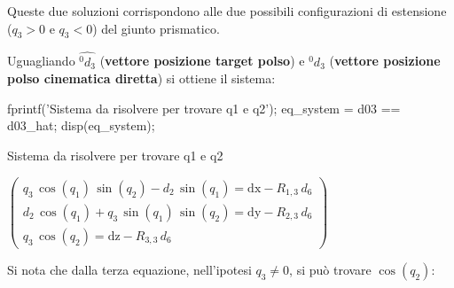 \documentclass[11pt, a4paper]{article}
\begin{document}
\begin{par}
\begin{flushleft}
Queste due soluzioni corrispondono alle due possibili configurazioni di estensione ($q_3 >0$ e $q_3 <0$) del giunto prismatico.
\end{flushleft}
\end{par}

\begin{par}
\begin{flushleft}
Uguagliando $\hat{^0 d_3 }$ (\textbf{vettore posizione target polso}) e $^0 d_3$ (\textbf{vettore posizione polso cinematica diretta}) si ottiene il sistema:
\end{flushleft}
\end{par}

\begin{matlabcode}
fprintf('Sistema da risolvere per trovare q1 e q2');
eq_system = d03 == d03_hat;
disp(eq_system);
\end{matlabcode}
\begin{matlaboutput}
Sistema da risolvere per trovare q1 e q2
\end{matlaboutput}
\begin{matlabsymbolicoutput}
$\displaystyle \left(\begin{array}{c}
q_3 \,\cos \left(q_1 \right)\,\sin \left(q_2 \right)-d_2 \,\sin \left(q_1 \right)=\textrm{dx}-R_{1,3} \,d_6 \\
d_2 \,\cos \left(q_1 \right)+q_3 \,\sin \left(q_1 \right)\,\sin \left(q_2 \right)=\textrm{dy}-R_{2,3} \,d_6 \\
q_3 \,\cos \left(q_2 \right)=\textrm{dz}-R_{3,3} \,d_6
\end{array}\right)$
\end{matlabsymbolicoutput}
\newpage
{}

\begin{par}
\begin{flushleft}
Si nota che dalla terza equazione, nell'ipotesi $q_3 \neq 0$, si può trovare $\cos (q_2 )$:
\end{flushleft}
\end{par}
\end{document}
